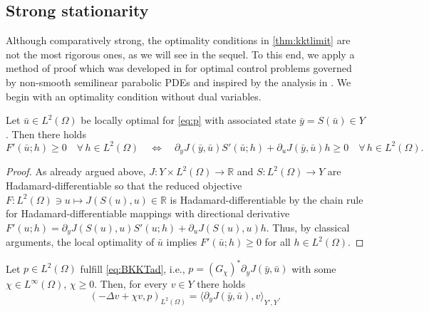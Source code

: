 \documentclass[reqno]{shinyart}
\begin{document}
\subsection{Strong stationarity}

Although comparatively strong, the optimality conditions in \cref{thm:kktlimit} are not the most rigorous 
ones, as we will see in the sequel. To this end, we apply a method of proof which was developed in \cite{ms16} 
for optimal control problems governed by non-smooth semilinear parabolic PDEs and inspired by the analysis in \cite{m76, mp84}.
We begin with an optimality condition without dual variables.
\begin{proposition}\label{prop:primal}
    Let $\bar{u} \in L^2(\Omega)$ be locally optimal for \eqref{eq:p} 
    with associated state $\bar{y} = S(\bar{u}) \in Y$. Then there holds
    \begin{equation}\label{eq:VI}
        F'(\bar{u}; h) \geq 0  \quad \forall\, h\in L^2(\Omega)
        \quad \Longleftrightarrow \quad
        \partial_y J(\bar{y}, \bar{u})S'(\bar{u};h) 
        + \partial_u J(\bar{y}, \bar{u})h \geq 0 \quad \forall\, h\in L^2(\Omega). 
    \end{equation}
\end{proposition}

\begin{proof}
    As already argued above, $J: Y \times L^2(\Omega) \to {\mathbb{R}}$ and $S: L^2(\Omega) \to Y$ 
    are Hadamard-differentiable so that the reduced objective $F: L^2(\Omega) \ni u \mapsto J(S(u), u) \in {\mathbb{R}}$ 
    is Hadamard-differentiable by the chain rule for Hadamard-differentiable mappings with directional derivative 
    $F'(u;h) = \partial_y J(S(u),u)S'(u;h) + \partial_u J(S(u),u) h$. 
    Thus, by classical arguments, the local optimality of $\bar{u}$ implies $F'(\bar u; h) \geq 0$ for all $h\in L^2(\Omega)$.
\end{proof}

\begin{lemma}\label{lem:adjoint}
    Let $p\in L^2(\Omega)$ fulfill \eqref{eq:BKKTad}, i.e., $p = (G_\chi)^*\partial_y J(\bar{y}, \bar{u})$ 
    with some $\chi \in L^\infty(\Omega)$, $\chi \geq 0$. Then, for every $v\in Y$ there holds
    \begin{equation}\label{eq:pdefoo2}
        (-\Delta v + \chi v , p)_{L^2(\Omega)}
        = {\langle {\partial_y J(\bar{y}, \bar{u})} , {v} \rangle}_{Y', Y}.
    \end{equation} 
\end{lemma}
\end{document}
